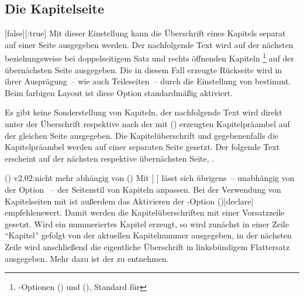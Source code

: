 \begin{Declaration*}{}
\begin{Declaration*}{}
\begin{Declaration*}{}
\subsection{Die Kapitelseite}
\begin{Declaration}{}%
  [false][:true]%
\printdeclarationlist%
%
%
%
%
%
%
Mit dieser Einstellung kann die Überschrift eines Kapitels separat auf einer 
Seite ausgegeben werden. Der nachfolgende Text wird auf der nächsten 
beziehungsweise bei doppelseitigem Satz und rechts öffnenden Kapiteln%
\footnote{%
  \KOMAScript-Optionen () und 
  (), Standard für %
}
auf der übernächsten Seite ausgegeben. Die in diesem Fall erzeugte Rückseite 
wird in ihrer Ausprägung~-- wie auch Teileseiten~-- durch die Einstellung von 
 bestimmt. Beim farbigen Layout ist diese Option 
standardmäßig aktiviert. \notudscrartcl
%
\begin{values}{}
\itemfalse
  Es gibt keine Sonderstellung von Kapiteln, der nachfolgende Text wird direkt 
  unter der Überschrift respektive nach der mit 
  () erzeugten Kapitelpräambel 
  auf der gleichen Seite ausgegeben.
\itemtrue*
  Die Kapitelüberschrift und gegebenenfalls die Kapitelpräambel werden auf 
  einer separaten Seite gesetzt. Der folgende Text erscheint auf der nächsten 
  respektive übernächsten Seite, .
\end{values}
%
(){%
  v2.02:nicht mehr abhängig von ()
}
Mit [%
]
lässt sich übrigens~-- unabhängig von der Option ~-- der 
Seitenstil von Kapiteln anpassen. Bei der Verwendung von Kapitelseiten mit 
 ist außerdem das Aktivieren der \KOMAScript-Option 
()|declare| 
empfehlenswert. Damit werden die Kapitelüberschriften mit einer Vorsatzzeile 
gesetzt. Wird ein nummeriertes Kapitel erzeugt, so wird zunächst in einer Zeile 
\enquote{Kapitel} gefolgt von der aktuellen Kapitelnummer ausgegeben, in der 
nächsten Zeile wird anschließend die eigentliche Überschrift in linksbündigem 
Flattersatz ausgegeben. Mehr dazu ist der  
zu entnehmen.
\end{Declaration}


\end{Declaration*}
\end{Declaration*}
\end{Declaration*}
